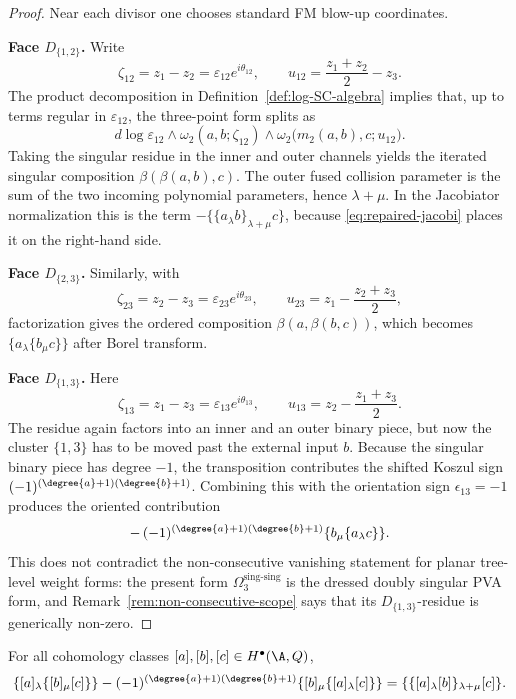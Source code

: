 \begin{proof}
Near each divisor one chooses standard FM blow-up coordinates.

\smallskip
\noindent\textbf{Face $D_{\{1,2\}}$.}
Write
\[
\zeta_{12}=z_1-z_2=\varepsilon_{12}e^{i\theta_{12}},
\qquad
u_{12}=\frac{z_1+z_2}{2}-z_3.
\]
The product decomposition in Definition~\ref{def:log-SC-algebra} implies that, up to terms regular in $\varepsilon_{12}$,
the three-point form splits as
\[
d\log\varepsilon_{12}\wedge
\omega_2(a,b;\zeta_{12})
\wedge
\omega_2\bigl(m_2(a,b),c;u_{12}\bigr).
\]
Taking the singular residue in the inner and outer channels yields the iterated singular
composition $\beta(\beta(a,b),c)$. The outer fused collision parameter
is the sum of the two incoming polynomial parameters, hence
\(\lambda+\mu\). In the Jacobiator normalization this is the term
\(-\{\{a_\lambda b\}_{\lambda+\mu}c\}\), because
\eqref{eq:repaired-jacobi} places it on the right-hand side.

\smallskip
\noindent\textbf{Face $D_{\{2,3\}}$.}
Similarly, with
\[
\zeta_{23}=z_2-z_3=\varepsilon_{23}e^{i\theta_{23}},
\qquad
u_{23}=z_1-\frac{z_2+z_3}{2},
\]
factorization gives the ordered composition $\beta(a,\beta(b,c))$, which becomes
$\{a_\lambda\{b_\mu c\}\}$ after Borel transform.

\smallskip
\noindent\textbf{Face $D_{\{1,3\}}$.}
Here
\[
\zeta_{13}=z_1-z_3=\varepsilon_{13}e^{i\theta_{13}},
\qquad
u_{13}=z_2-\frac{z_1+z_3}{2}.
\]
The residue again factors into an inner and an outer binary piece, but now the
cluster $\{1,3\}$ has to be moved past the external input $b$. Because the singular
binary piece has degree $-1$, the transposition contributes the shifted Koszul sign
$(-1)^{(\degree{a}+1)(\degree{b}+1)}$. Combining this with the orientation sign
$\epsilon_{13}=-1$ produces the oriented contribution
\[
-\,(-1)^{(\degree{a}+1)(\degree{b}+1)}
\{b_\mu\{a_\lambda c\}\}.
\]
This does not contradict the non-consecutive vanishing statement for
planar tree-level weight forms: the present form
\(\Omega_3^{\mathrm{sing}\text{-}\mathrm{sing}}\) is the dressed
doubly singular PVA form, and
Remark~\ref{rem:non-consecutive-scope} says that its
\(D_{\{1,3\}}\)-residue is generically non-zero.
\end{proof}

\begin{theorem}
\label{thm:Jacobi}
For all cohomology classes $[a],[b],[c]\in H^\bullet(\A,Q)$,
\begin{equation}
\label{eq:repaired-jacobi}
\{[a]_\lambda\{[b]_\mu[c]\}\}
-
(-1)^{(\degree{a}+1)(\degree{b}+1)}
\{[b]_\mu\{[a]_\lambda[c]\}\}
=
\{\{[a]_\lambda[b]\}_{\lambda+\mu}[c]\}.
\end{equation}
\end{theorem}

